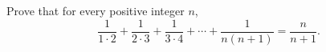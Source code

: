 Prove that for every positive integer $n$,
\[\dfrac{1}{1\cdot2}+\dfrac{1}{2\cdot3}+\dfrac{1}{3\cdot4}+\cdots+\dfrac{1}{n(n+1)}=\dfrac{n}{n+1}.\]

